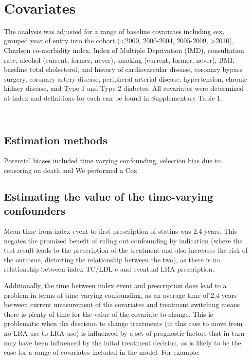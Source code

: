 \documentclass[a4paper, twoside]{templates/ociamthesis}
\begin{document}
~

\hypertarget{covariates}{%
\section{Covariates}\label{covariates}}

The analysis was adjusted for a range of baseline covariates including sex, grouped year of entry into the cohort (\textless2000, 2000-2004, 2005-2009, \textgreater2010), Charlson co-morbidity index, Index of Multiple Deprivation (IMD), consultation rate, alcohol (current, former, never), smoking (current, former, never), BMI, baseline total cholesterol, and history of cardiovascular disease, coronary bypass surgery, coronary artery disease, peripheral arterial disease, hypertension, chronic kidney disease, and Type 1 and Type 2 diabetes. All
covariates were determined at index and definitions for each can be found in Supplementary Table 1.

~

\hypertarget{estimation-methods}{%
\subsection{Estimation methods}\label{estimation-methods}}

Potential biases included time varying confounding, selection bias due to censoring on death and
We performed a Cox

\hypertarget{estimating-the-value-of-the-time-varying-confounders}{%
\subsection{Estimating the value of the time-varying confounders}\label{estimating-the-value-of-the-time-varying-confounders}}

Mean time from index event to first prescription of statins was 2.4 years. This negates the promised benefit of ruling out confounding by indication (where the test result leads to the prescription of the treatment and also increases the risk of the outcome, distorting the relationship between the two), as there is no relationship between index TC/LDL-c and eventual LRA prescription.

Additionally, the time between index event and prescription does lead to a problem in terms of time varying confounding, as an average time of 2.4 years between current measurement of the covariates and treatment switching means there is plenty of time for the value of the covariate to change. This is problematic when the descision to change treatments (in this case to move from no LRA use to LRA use) is influenced by a set of prognostic factors that in turn may have been influenced by the inital treatment decision, as is likely to be the case for a range of covariates included in the model. For example:
\end{document}
